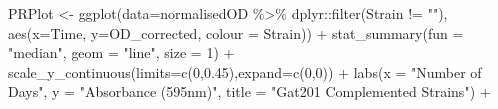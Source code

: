 \documentclass[
]{article}
\newenvironment{Shaded}{\begin{snugshade}}{\end{snugshade}}
\newcommand{\AttributeTok}[1]{\textcolor[rgb]{0.77,0.63,0.00}{#1}}
\newcommand{\DecValTok}[1]{\textcolor[rgb]{0.00,0.00,0.81}{#1}}
\newcommand{\FloatTok}[1]{\textcolor[rgb]{0.00,0.00,0.81}{#1}}
\newcommand{\FunctionTok}[1]{\textcolor[rgb]{0.00,0.00,0.00}{#1}}
\newcommand{\NormalTok}[1]{#1}
\newcommand{\OtherTok}[1]{\textcolor[rgb]{0.56,0.35,0.01}{#1}}
\newcommand{\SpecialCharTok}[1]{\textcolor[rgb]{0.00,0.00,0.00}{#1}}
\newcommand{\StringTok}[1]{\textcolor[rgb]{0.31,0.60,0.02}{#1}}
\begin{document}
\begin{Shaded}
\begin{Highlighting}[]
\NormalTok{PRPlot }\OtherTok{\textless{}{-}} \FunctionTok{ggplot}\NormalTok{(}\AttributeTok{data=}\NormalTok{normalisedOD }\SpecialCharTok{\%\textgreater{}\%}
\NormalTok{                 dplyr}\SpecialCharTok{::}\FunctionTok{filter}\NormalTok{(Strain }\SpecialCharTok{!=} \StringTok{""}\NormalTok{),}
                \FunctionTok{aes}\NormalTok{(}\AttributeTok{x=}\NormalTok{Time, }\AttributeTok{y=}\NormalTok{OD\_corrected, }\AttributeTok{colour =}\NormalTok{ Strain)) }\SpecialCharTok{+} 
                \FunctionTok{stat\_summary}\NormalTok{(}\AttributeTok{fun =} \StringTok{"median"}\NormalTok{, }\AttributeTok{geom =} \StringTok{"line"}\NormalTok{, }\AttributeTok{size =} \DecValTok{1}\NormalTok{) }\SpecialCharTok{+}
                \FunctionTok{scale\_y\_continuous}\NormalTok{(}\AttributeTok{limits=}\FunctionTok{c}\NormalTok{(}\DecValTok{0}\NormalTok{,}\FloatTok{0.45}\NormalTok{),}\AttributeTok{expand=}\FunctionTok{c}\NormalTok{(}\DecValTok{0}\NormalTok{,}\DecValTok{0}\NormalTok{)) }\SpecialCharTok{+}
        \FunctionTok{labs}\NormalTok{(}\AttributeTok{x =} \StringTok{"Number of Days"}\NormalTok{,}
            \AttributeTok{y =} \StringTok{"Absorbance (595nm)"}\NormalTok{,}
            \AttributeTok{title =} \StringTok{"Gat201 Complemented Strains"}\NormalTok{) }\SpecialCharTok{+}
       

\end{Highlighting}
\end{Shaded}
\end{document}
